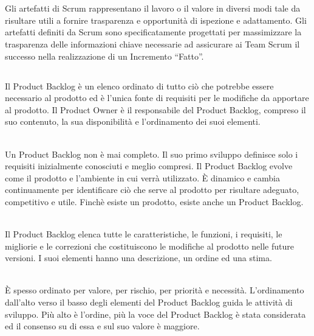 
\section*{\color{Blue}{Gli Artefatti di Scrum}}
\label{sec:artifacts}
Gli artefatti di Scrum rappresentano il lavoro o il valore in diversi modi tale da risultare utili a fornire trasparenza e 
opportunit\`a di ispezione e adattamento. Gli artefatti definiti da Scrum sono specificatamente progettati per massimizzare la 
trasparenza delle informazioni chiave necessarie ad assicurare ai Team Scrum il successo nella realizzazione di un Incremento 
``Fatto''.

\subsection*{\color{SteelBlue}{Product Backlog}}
\label{sec:product_backlog}
Il Product Backlog \`e un elenco ordinato di tutto ciò che potrebbe essere necessario al prodotto ed \`e l'unica fonte di 
requisiti per le modifiche da apportare al prodotto. Il Product Owner \`e il responsabile del Product Backlog, compreso il suo 
contenuto, la sua disponibilità e l'ordinamento dei suoi elementi. \newline

\\Un Product Backlog non \`e mai completo. Il suo primo sviluppo definisce solo i requisiti inizialmente conosciuti e 
meglio compresi. Il Product Backlog evolve come il prodotto e l'ambiente in cui verrà utilizzato. \`E dinamico e cambia 
continuamente per identificare ci\`o che serve al prodotto per risultare adeguato, competitivo e utile. Finch\`e esiste un 
prodotto, esiste anche un Product Backlog. \newline

\\Il Product Backlog elenca tutte le caratteristiche, le funzioni, i requisiti, le migliorie e le correzioni che costituiscono 
le modifiche al prodotto nelle future versioni. I suoi elementi hanno una descrizione, un ordine ed una stima. \newline

\\ \`E spesso ordinato per valore, per rischio, per priorità e necessità. L'ordinamento dall'alto verso il basso degli 
elementi del Product Backlog guida le attività di sviluppo. Pi\`u alto \`e l'ordine, pi\`u la voce del Product Backlog \`e 
stata considerata ed il consenso su di essa e sul suo valore \`e maggiore. \newline

